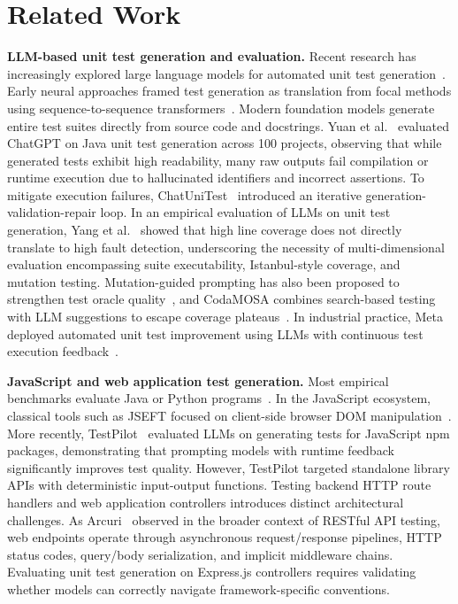 \documentclass[sigconf]{acmart}
\begin{document}
\section{Related Work}

\textbf{LLM-based unit test generation and evaluation.}
Recent research has increasingly explored large language models for automated unit test generation~\cite{wang2024survey}. Early neural approaches framed test generation as translation from focal methods using sequence-to-sequence transformers~\cite{tufano2020transformers}. Modern foundation models generate entire test suites directly from source code and docstrings. Yuan et al.~\cite{yuan2023chatgpt} evaluated ChatGPT on Java unit test generation across 100 projects, observing that while generated tests exhibit high readability, many raw outputs fail compilation or runtime execution due to hallucinated identifiers and incorrect assertions. To mitigate execution failures, ChatUniTest~\cite{xie2023chatunitest} introduced an iterative generation-validation-repair loop. In an empirical evaluation of LLMs on unit test generation, Yang et al.~\cite{yang2024evaluation} showed that high line coverage does not directly translate to high fault detection, underscoring the necessity of multi-dimensional evaluation encompassing suite executability, Istanbul-style coverage, and mutation testing. Mutation-guided prompting has also been proposed to strengthen test oracle quality~\cite{dakhel2024mutap}, and CodaMOSA combines search-based testing with LLM suggestions to escape coverage plateaus~\cite{lemieux2023codamosa}. In industrial practice, Meta deployed automated unit test improvement using LLMs with continuous test execution feedback~\cite{alshahwan2024meta}.

\textbf{JavaScript and web application test generation.}
Most empirical benchmarks evaluate Java or Python programs~\cite{fraser2011evosuite,lukasczyk2022pynguin,siddiq2024junit}. In the JavaScript ecosystem, classical tools such as JSEFT focused on client-side browser DOM manipulation~\cite{mirshokraie2015jseft}. More recently, TestPilot~\cite{schafer2024testpilot} evaluated LLMs on generating tests for JavaScript npm packages, demonstrating that prompting models with runtime feedback significantly improves test quality. However, TestPilot targeted standalone library APIs with deterministic input-output functions. Testing backend HTTP route handlers and web application controllers introduces distinct architectural challenges. As Arcuri~\cite{arcuri2019evomaster} observed in the broader context of RESTful API testing, web endpoints operate through asynchronous request/response pipelines, HTTP status codes, query/body serialization, and implicit middleware chains. Evaluating unit test generation on Express.js controllers requires validating whether models can correctly navigate framework-specific conventions.
\end{document}
